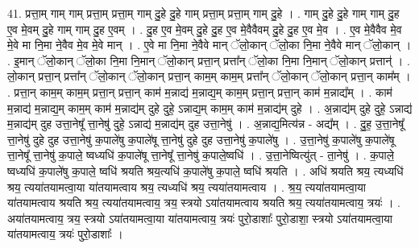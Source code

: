\documentclass[17pt]{extarticle}
\begin{document}
41. प्रत्ता॒म् गाम् गाम् प्रत्ता॒म् प्रत्ता॒म् गाम् दु॒हे दु॒हे गाम् प्रत्ता॒म् प्रत्ता॒म् गाम् दु॒हे । . गाम् दु॒हे दु॒हे गाम् गाम् दु॒ह ए॒व मे॒वम् दु॒हे गाम् गाम् दु॒ह ए॒वम् । . दु॒ह ए॒व मे॒वम् दु॒हे दु॒ह ए॒व मे॒वैवैवम् दु॒हे दु॒ह ए॒व मे॒व । . ए॒व मे॒वैवैव मे॒व मे॒वे मा नि॒मा ने॒वैव मे॒व मे॒वे मान् । . ए॒वे मा नि॒मा ने॒वैवे मान् ॅलो॒कान् ॅलो॒का नि॒मा ने॒वैवे मान् ॅलो॒कान् । . इ॒मान् ॅलो॒कान् ॅलो॒का नि॒मा नि॒मान् ॅलो॒कान् प्रत्ता॒न् प्रत्ता᳚न् ॅलो॒का नि॒मा नि॒मान् ॅलो॒कान् प्रत्तान्॑ । . लो॒कान् प्रत्ता॒न् प्रत्ता᳚न् ॅलो॒कान् ॅलो॒कान् प्रत्ता॒न् काम॒म् काम॒म् प्रत्ता᳚न् ॅलो॒कान् ॅलो॒कान् प्रत्ता॒न् काम᳚म् । . प्रत्ता॒न् काम॒म् काम॒म् प्रत्ता॒न् प्रत्ता॒न् काम॑ म॒न्नाद्य॑ म॒न्नाद्य॒म् काम॒म् प्रत्ता॒न् प्रत्ता॒न् काम॑ म॒न्नाद्य᳚म् । . काम॑ म॒न्नाद्य॑ म॒न्नाद्य॒म् काम॒म् काम॑ म॒न्नाद्य॑म् दुहे दुहे॒ ऽन्नाद्य॒म् काम॒म् काम॑ म॒न्नाद्य॑म् दुहे । . अ॒न्नाद्य॑म् दुहे दुहे॒ ऽन्नाद्य॑ म॒न्नाद्य॑म् दुह उत्ता॒नेषू᳚ त्ता॒नेषु॑ दुहे॒ ऽन्नाद्य॑ म॒न्नाद्य॑म् दुह उत्ता॒नेषु॑ । . अ॒न्नाद्य॒मित्य॑न्न - अद्य᳚म् । . दु॒ह॒ उ॒त्ता॒नेषू᳚ त्ता॒नेषु॑ दुहे दुह उत्ता॒नेषु॑ क॒पाले॑षु क॒पाले॑षू त्ता॒नेषु॑ दुहे दुह उत्ता॒नेषु॑ क॒पाले॑षु । . उ॒त्ता॒नेषु॑ क॒पाले॑षु क॒पाले॑षू त्ता॒नेषू᳚ त्ता॒नेषु॑ क॒पाले॒ ष्वध्यधि॑ क॒पाले॑षू त्ता॒नेषू᳚ त्ता॒नेषु॑ क॒पाले॒ष्वधि॑ । . उ॒त्ता॒नेष्वित्यु॑त् - ता॒नेषु॑ । . क॒पाले॒ ष्वध्यधि॑ क॒पाले॑षु क॒पाले॒ ष्वधि॑ श्रयति श्रय॒त्यधि॑ क॒पाले॑षु क॒पाले॒ ष्वधि॑ श्रयति । . अधि॑ श्रयति श्रय॒ त्यध्यधि॑ श्रय॒ त्यया॑तयामत्वा॒या या॑तयामत्वाय श्रय॒ त्यध्यधि॑ श्रय॒ त्यया॑तयामत्वाय । . श्र॒य॒ त्यया॑तयामत्वा॒या या॑तयामत्वाय श्रयति श्रय॒ त्यया॑तयामत्वाय॒ त्रय॒ स्त्रयो ऽया॑तयामत्वाय श्रयति श्रय॒ त्यया॑तयामत्वाय॒ त्रयः॑ । . अया॑तयामत्वाय॒ त्रय॒ स्त्रयो ऽया॑तयामत्वा॒या या॑तयामत्वाय॒ त्रयः॑ पुरो॒डाशाः᳚ पुरो॒डाशा॒ स्त्रयो ऽया॑तयामत्वा॒या या॑तयामत्वाय॒ त्रयः॑ पुरो॒डाशाः᳚ । \newline
\end{document}
